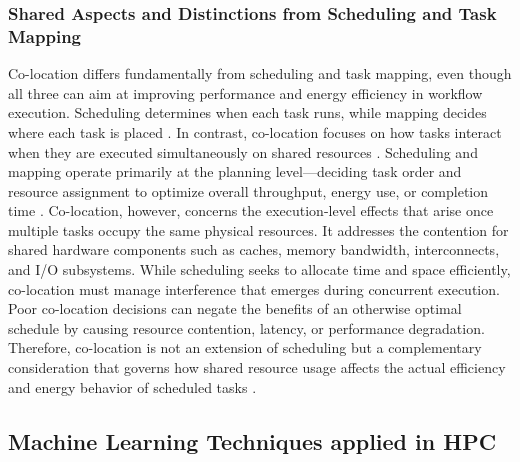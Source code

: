 \subsubsection{Shared Aspects and Distinctions from Scheduling and Task Mapping}
\label{sec:background_colocation_scheduling}
Co-location differs fundamentally from scheduling and task mapping, even though all three can aim at improving performance and energy efficiency in workflow execution. Scheduling determines when each task runs, while mapping decides where each task is placed \cite{9284517} \cite{Merkel_2010}. In contrast, co-location focuses on how tasks interact when they are executed simultaneously on shared resources \cite{9499521} \cite{9112926} \cite{Dauwe_2016}.
Scheduling and mapping operate primarily at the planning level—deciding task order and resource assignment to optimize overall throughput, energy use, or completion time \cite{Choudhary_2022}. Co-location, however, concerns the execution-level effects that arise once multiple tasks occupy the same physical resources. It addresses the contention for shared hardware components such as caches, memory bandwidth, interconnects, and I/O subsystems.
While scheduling seeks to allocate time and space efficiently, co-location must manage interference that emerges during concurrent execution. Poor co-location decisions can negate the benefits of an otherwise optimal schedule by causing resource contention, latency, or performance degradation. Therefore, co-location is not an extension of scheduling but a complementary consideration that governs how shared resource usage affects the actual efficiency and energy behavior of scheduled tasks \cite{5644899}.

\subsection{Machine Learning Techniques applied in HPC}
\label{sec:background_ml}
